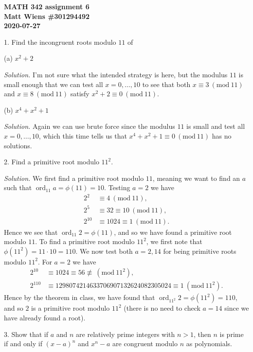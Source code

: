 \documentclass{article}
\newcommand{\Mod}[1]{\ (\mathrm{mod}\ #1)}
\DeclareMathOperator{\ord}{ord}
\begin{document}
\textbf{MATH 342 assignment 6} \\
\textbf{Matt Wiens \#301294492} \\
\textbf{2020-07-27}

1. Find the incongruent roots modulo $11$ of

(a) $x^2 + 2$

\textit{Solution.}
I'm not sure what the intended strategy is here, but the modulus $11$ is
small enough that we can test all $x = 0, \ldots, 10$ to see that
both $x \equiv 3 \Mod{11}$ and $x \equiv 8 \Mod{11}$ satisfy
$x^2 + 2 \equiv 0 \Mod{11}$.

\vspace{5mm}

(b) $x^4 + x^2 + 1$

\textit{Solution.}
Again we can use brute force since the modulus $11$ is small and test
all $x = 0, \ldots, 10$, which this time tells us that
$x^4 + x^2 + 1 \equiv 0 \Mod{11}$ has no solutions.

\newpage

2. Find a primitive root modulo $11^2$.

\textit{Solution.}
We first find a primitive root modulo $11$, meaning we want to find an $a$
such that $\ord_{11} a = \phi(11) = 10$. Testing $a = 2$ we have
%
\begin{align*}
    2^2 &\equiv 4 \Mod{11}, \\
    2^5 &\equiv 32 \equiv 10 \Mod{11}, \\
    2^{10} &\equiv 1024 \equiv 1 \Mod{11}
    .
\end{align*}
%
Hence we see that $\ord_{11} 2 = \phi(11)$, and so we have found a
primitive root modulo $11$. To find a primitive root modulo $11^2$,
we first note that $\phi(11^2) = 11 \cdot 10 = 110$. We now test
both $a = 2, 14$ for being primitive roots modulo $11^2$. For
$a = 2$ we have
%
\begin{align*}
    2^{10} &\equiv 1024 \equiv 56 \not\equiv \Mod{11^2}
    , \\
    2^{110} &\equiv 1298074214633706907132624082305024 \equiv 1 \Mod{11^2}
    .
\end{align*}
%
Hence by the theorem in class, we have found that
$\ord_{11^2} 2 = \phi(11^2) = 110$, and so $2$ is a primitive root modulo
$11^2$ (there is no need to check $a = 14$ since we have already found a
root).


\newpage

3. Show that if $a$ and $n$ are relatively prime integers with $n > 1$,
then $n$ is prime if and only if $(x - a)^n$ and $x^n - a$ are congruent
modulo $n$ as polynomials.
\end{document}
